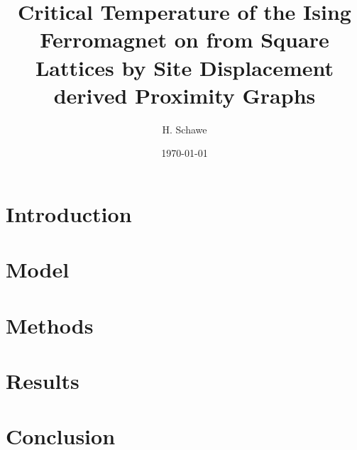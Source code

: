 \documentclass[prl,twocolumn,groupedaddress,showpacs,showkeys,amsmath,amssymb,floatfix]{revtex4-1}
\begin{document}
    \title{Critical Temperature of the Ising Ferromagnet on from Square Lattices by Site Displacement derived Proximity Graphs}
    \author{H. Schawe}
    \date{\today}

    \begin{abstract}
    
    \end{abstract}

    \maketitle

    \section{Introduction}
        

    \section{Model}
        

    \section{Methods}
        

    \section{Results}
        

    \section{Conclusion}
        

    

    
\end{document}
